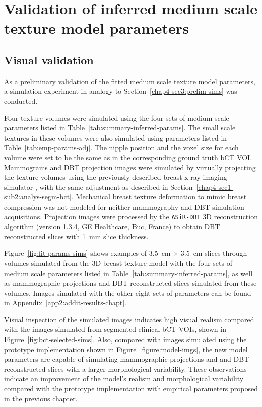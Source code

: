 \documentclass[journal]{IEEEtran}
\begin{document}
\section{Validation of inferred medium scale texture model parameters}
\label{sec4-sub3:simulations}

\subsection{Visual validation}
\label{sec:visual-validation}

As a preliminary validation of the fitted medium scale texture model
parameters, a simulation experiment in analogy to
Section~\ref{chap4-sec3:prelim-sims} was conducted.

Four texture volumes were simulated using the four sets of medium
scale parameters listed in
Table~\ref{tab:summary-inferred-params}. The small scale textures in
these volumes were also simulated using parameters listed in
Table~\ref{tab:emp-params-adj}. The nipple position and the voxel size
for each volume were set to be the same as in the corresponding ground
truth bCT VOI. Mammograms and DBT projection images were simulated by
virtually projecting the texture volumes using the previously
described breast x-ray imaging simulator \cite{milioni2014low}, with
the same adjustment as described in
Section~\ref{chap4-sec1-sub2:analys-segm-bct}. Mechanical breast
texture deformation to mimic breast compression was not modeled for
neither mammography and DBT simulation acquisitions. Projection images
were processed by the \texttt{ASiR-DBT} 3D reconstruction algorithm
(version 1.3.4, GE Healthcare, Buc, France) to obtain DBT
reconstructed slices with \SI{1}{\mm} slice thickness.

Figure~\ref{fig:fit-params-sims} shows examples of \SI{3.5}{\cm}
$\times$ \SI{3.5}{\cm} slices through volumes simulated from the 3D
breast texture model with the four sets of medium scale parameters
listed in Table~\ref{tab:summary-inferred-params}, as well as
mammographic projections and DBT reconstructed slices simulated from
these volumes. Images simulated with the other eight sets of
parameters can be found in Appendix~\ref{app2:addit-results-chapt}.

Visual inspection of the simulated images indicates high visual
realism compared with the images simulated from segmented clinical bCT
VOIs, shown in Figure~\ref{fig:bct-selected-sims}. Also, compared with
images simulated using the prototype implementation shown in
Figure~\ref{figure:model-imgs}, the new model parameters are capable
of simulating mammographic projections and and DBT reconstructed
slices with a larger morphological variability. These observations
indicate an improvement of the model's realism and morphological
variability compared with the prototype implementation with empirical
parameters proposed in the previous chapter.
\end{document}
